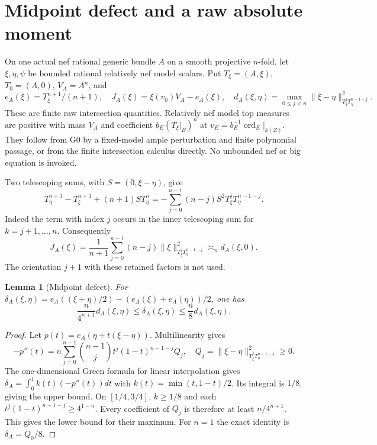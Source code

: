 \documentclass[10pt]{article}
\newtheorem{lemma}[theorem]{Lemma}
\begin{document}
\section{Midpoint defect and a raw absolute moment}
On one actual nef rational generic bundle $A$ on a smooth projective
$n$-fold, let $\xi,\eta,\psi$ be bounded rational relatively nef model
scalars. Put $T_\xi=(A,\xi)$, $T_0=(A,0)$, $V_A=A^n$, and
\[
 e_A(\xi)=T_\xi^{n+1}/(n+1),\quad
 J_A(\xi)=\xi(v_0)V_A-e_A(\xi),\quad
 d_A(\xi,\eta)=\max_{0\leq j<n}
   \|\xi-\eta\|_{T_\xi^jT_\eta^{n-1-j}}^2.
\]
These are finite raw intersection quantities. Relatively nef model top
measures are positive with mass $V_A$ and coefficient
$b_E(T_\xi|_E)^n$ at $v_E=b_E^{-1}\operatorname{ord}_E|_{k(Z)}$.
They follow from G0 by a fixed-model ample perturbation and finite
polynomial passage, or from the finite intersection calculus directly.
No unbounded nef or big equation is invoked.

Two telescoping sums, with $S=(0,\xi-\eta)$, give
\begin{equation}\label{correct}
 T_\eta^{n+1}-T_\xi^{n+1}+(n+1)ST_\eta^n
 =-\sum_{j=0}^{n-1}(n-j)S^2T_\xi^jT_\eta^{n-1-j}.
\end{equation}
Indeed the term with index $j$ occurs in the inner telescoping sum for
$k=j+1,\ldots,n$. Consequently
\begin{equation}\label{J-formula}
 J_A(\xi)=\frac1{n+1}\sum_{j=0}^{n-1}(n-j)
       \|\xi\|_{T_\xi^jT_0^{n-1-j}}^2\asymp_n d_A(\xi,0).
\end{equation}
The orientation $j+1$ with these retained factors is not used.

\begin{lemma}[Midpoint defect]\label{midpoint}
For $\delta_A(\xi,\eta)=e_A((\xi+\eta)/2)
 -(e_A(\xi)+e_A(\eta))/2$, one has
\begin{equation}\label{midbound}
 \frac{n}{4^{n+1}}d_A(\xi,\eta)
 \leq\delta_A(\xi,\eta)\leq\frac n8d_A(\xi,\eta).
\end{equation}
\end{lemma}
\begin{proof}
Let $p(t)=e_A(\eta+t(\xi-\eta))$. Multilinearity gives
\[
 -p''(t)=n\sum_{j=0}^{n-1}\binom{n-1}{j}
          t^j(1-t)^{n-1-j}Q_j,\quad
 Q_j=\|\xi-\eta\|_{T_\xi^jT_\eta^{n-1-j}}^2\geq0.
\]
The one-dimensional Green formula for linear interpolation gives
$\delta_A=\int_0^1 k(t)(-p''(t))dt$ with
$k(t)=\min(t,1-t)/2$. Its integral is $1/8$, giving the upper bound.
On $[1/4,3/4]$, $k\geq1/8$ and each
$t^j(1-t)^{n-1-j}\geq4^{1-n}$. Every coefficient of $Q_j$ is therefore
at least $n/4^{n+1}$. This gives the lower bound for their maximum.
For $n=1$ the exact identity is $\delta_A=Q_0/8$.
\end{proof}
\end{document}
